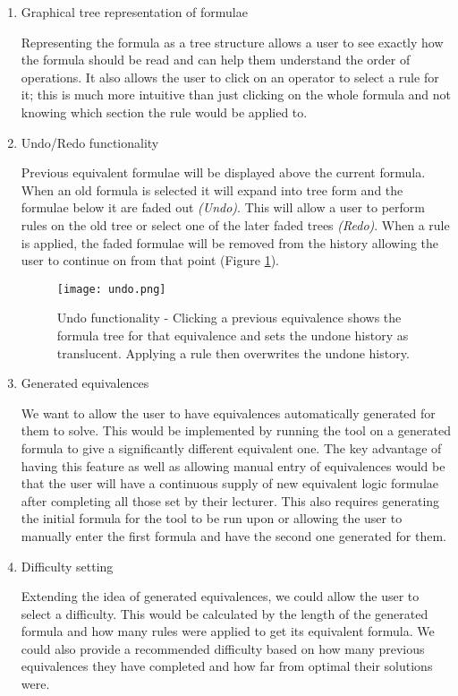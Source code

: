 \documentclass{report}
\begin{document}
\begin{enumerate}
\item Graphical tree representation of formulae

Representing the formula as a tree structure allows a user to see exactly how the formula should be read and can help them understand the order of operations. It also allows the user to click on an operator to select a rule for it; this is much more intuitive than just clicking on the whole formula and not knowing which section the rule would be applied to.

\item Undo/Redo functionality

Previous equivalent formulae will be displayed above the current formula. When an old formula is selected it will expand into tree form and the formulae below it are faded out \textit{(Undo)}. This will allow a user to perform rules on the old tree or select one of the later faded trees \textit{(Redo)}. When a rule is applied, the faded formulae will be removed from the history allowing the user to continue on from that point (Figure \ref{undo}).

\begin{figure}[ht]
    \centering
    \texttt{[image: undo.png]}
    \caption{Undo functionality - Clicking a previous equivalence shows the formula tree for that equivalence and sets the undone history as translucent. Applying a rule then overwrites the undone history.}
    \label{undo}
\end{figure}

\item Generated equivalences

We want to allow the user to have equivalences automatically generated for them to solve. This would be implemented by running the tool on a generated formula to give a significantly different equivalent one. The key advantage of having this feature as well as allowing manual entry of equivalences would be that the user will have a continuous supply of new equivalent logic formulae after completing all those set by their lecturer. This also requires generating the initial formula for the tool to be run upon or allowing the user to manually enter the first formula and have the second one generated for them.

\item Difficulty setting

Extending the idea of generated equivalences, we could allow the user to select a difficulty. This would be calculated by the length of the generated formula and how many rules were applied to get its equivalent formula. We could also provide a recommended difficulty based on how many previous equivalences they have completed and how far from optimal their solutions were.


\end{enumerate}
\end{document}
